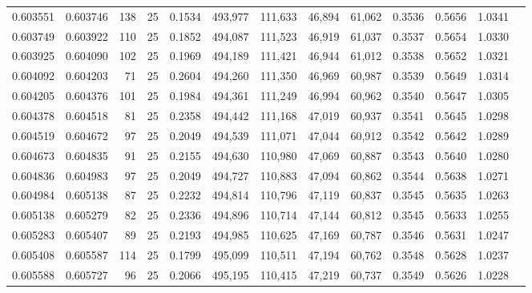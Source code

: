\begin{tabular}{rrrrrrrrrrrrr}
0.603551 & 0.603746 &   138 &  25 &                                     0.1534 & 493,977 & 111,633 &  46,894 &  61,062 & 0.3536 & 0.5656 & 1.0341 \\
0.603749 & 0.603922 &   110 &  25 &                                     0.1852 & 494,087 & 111,523 &  46,919 &  61,037 & 0.3537 & 0.5654 & 1.0330 \\
0.603925 & 0.604090 &   102 &  25 &                                     0.1969 & 494,189 & 111,421 &  46,944 &  61,012 & 0.3538 & 0.5652 & 1.0321 \\
0.604092 & 0.604203 &    71 &  25 &                                     0.2604 & 494,260 & 111,350 &  46,969 &  60,987 & 0.3539 & 0.5649 & 1.0314 \\
0.604205 & 0.604376 &   101 &  25 &                                     0.1984 & 494,361 & 111,249 &  46,994 &  60,962 & 0.3540 & 0.5647 & 1.0305 \\
0.604378 & 0.604518 &    81 &  25 &                                     0.2358 & 494,442 & 111,168 &  47,019 &  60,937 & 0.3541 & 0.5645 & 1.0298 \\
0.604519 & 0.604672 &    97 &  25 &                                     0.2049 & 494,539 & 111,071 &  47,044 &  60,912 & 0.3542 & 0.5642 & 1.0289 \\
0.604673 & 0.604835 &    91 &  25 &                                     0.2155 & 494,630 & 110,980 &  47,069 &  60,887 & 0.3543 & 0.5640 & 1.0280 \\
0.604836 & 0.604983 &    97 &  25 &                                     0.2049 & 494,727 & 110,883 &  47,094 &  60,862 & 0.3544 & 0.5638 & 1.0271 \\
0.604984 & 0.605138 &    87 &  25 &                                     0.2232 & 494,814 & 110,796 &  47,119 &  60,837 & 0.3545 & 0.5635 & 1.0263 \\
0.605138 & 0.605279 &    82 &  25 &                                     0.2336 & 494,896 & 110,714 &  47,144 &  60,812 & 0.3545 & 0.5633 & 1.0255 \\
0.605283 & 0.605407 &    89 &  25 &                                     0.2193 & 494,985 & 110,625 &  47,169 &  60,787 & 0.3546 & 0.5631 & 1.0247 \\
0.605408 & 0.605587 &   114 &  25 &                                     0.1799 & 495,099 & 110,511 &  47,194 &  60,762 & 0.3548 & 0.5628 & 1.0237 \\
0.605588 & 0.605727 &    96 &  25 &                                     0.2066 & 495,195 & 110,415 &  47,219 &  60,737 & 0.3549 & 0.5626 & 1.0228 \\

\end{tabular}
